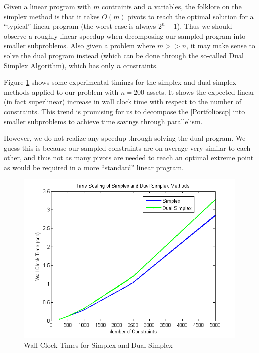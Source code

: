 \documentclass[12pt]{article}
\begin{document}
Given a linear program with $m$ contraints and $n$ variables, the folklore on the simplex method is that it takes $O(m)$ pivots to reach the optimal solution for a ``typical'' linear program (the worst case is always $2^n - 1$).
Thus we should observe a roughly linear speedup when decomposing our sampled program into smaller subproblems.
Also given a problem where $m >> n$, it may make sense to solve the dual program instead (which can be done through the so-called Dual Simplex Algorithm), which has only $n$ constraints.

Figure \ref{fig:fig_simplex_time} shows some experimental timings for the simplex and dual simplex methods applied to our problem with $n = 200$ assets.
It shows the expected linear (in fact superlinear) increase in wall clock time with respect to the number of constraints.
This trend is promising for us to decompose the \ref{Portfolioscp} into smaller subproblems to achieve time savings through parallelism.

However, we do not realize any speedup through solving the dual program.  
We guess this is because our sampled constraints are on average very similar to each other, and thus not as many pivots are needed to reach an optimal extreme point as would be required in a more ``standard'' linear program.

\begin{figure}[ht]
	\centering
		\includegraphics[scale=0.9]{../plot/figs/fig_simplex_time.png}
	\caption{Wall-Clock Times for Simplex and Dual Simplex}
	\label{fig:fig_simplex_time}
\end{figure}
\end{document}
